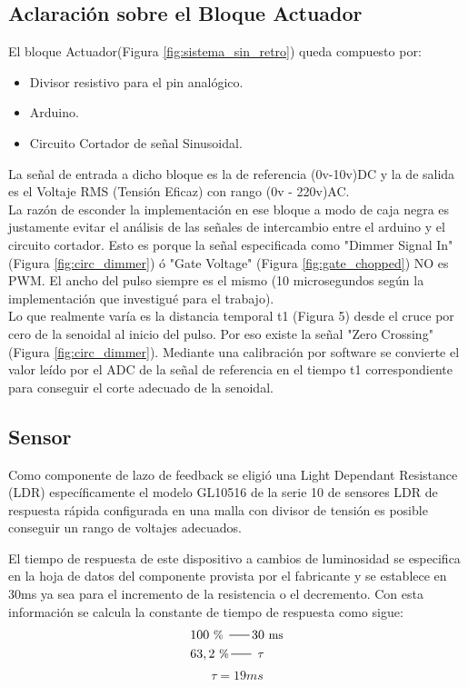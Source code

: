 \documentclass[a4paper,11pt]{article}
\begin{document}
\subsection{Aclaración sobre el Bloque Actuador}
El bloque Actuador(Figura \ref{fig:sistema_sin_retro}) queda compuesto por:
\begin{itemize}
	\item Divisor resistivo para el pin analógico.
	\item Arduino.
	\item Circuito Cortador de señal Sinusoidal.
\end{itemize}
La señal de entrada a dicho bloque es la de referencia (0v-10v)DC y la de salida es el Voltaje RMS (Tensión Eficaz) con rango (0v - 220v)AC.\\
La razón de esconder la implementación en ese bloque a modo de caja negra es justamente evitar el análisis de las señales de intercambio entre el arduino y el circuito cortador.
Esto es porque la señal especificada como "Dimmer Signal In" (Figura \ref{fig:circ_dimmer}) ó "Gate Voltage" (Figura \ref{fig:gate_chopped}) NO es PWM.
El ancho del pulso siempre es el mismo (10 microsegundos según la implementación que investigué para el trabajo).\\
Lo que realmente varía es la distancia temporal t1 (Figura 5) desde el cruce por cero de la senoidal al inicio del pulso. Por eso existe la señal "Zero Crossing"(Figura \ref{fig:circ_dimmer}).
Mediante una calibración por software se convierte el valor leído por el ADC de la señal de referencia en el tiempo t1 correspondiente para conseguir el corte adecuado de la senoidal. 

\subsection{Sensor}
Como componente de lazo de feedback se eligió una Light Dependant Resistance (LDR) específicamente el modelo GL10516 de la serie 10 de sensores LDR de respuesta rápida configurada en una malla con divisor de tensión es posible conseguir un rango de voltajes adecuados.

El tiempo de respuesta de este dispositivo a cambios de luminosidad se especifica en la hoja de datos del componente provista por el fabricante y se establece en 30ms ya sea para el incremento de la resistencia o el decremento. Con esta información se calcula la constante de tiempo de respuesta como sigue:
\begin{align*}
& 100~\text{\small \% } \,\rule[2.5pt]{16pt}{0.5pt}\,
30~\text{\small ms}\\
& 63,2~\text{\small \%} \,\rule[2.5pt]{16pt}{0.5pt}\,
~\text{\small $\tau$}
\end{align*}
$$\tau = 19ms$$
\end{document}
